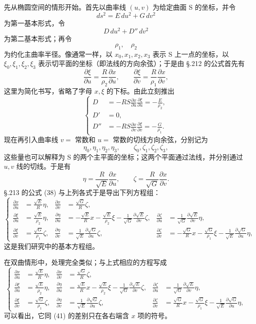 先从椭圆空间的情形开始。首先以曲率线 $(u,v)$ 为给定曲面 S 的坐标，并令
\[
ds^2=E\,du^2+G\,dv^2
\]
为第一基本形式，令
\[
D\,du^2+D''\,dv^2
\]
为第二基本形式；再令
\[
\rho_1,\quad \rho_2
\]
为约化主曲率半径。像通常一样，以 $x_0,x_1,x_2,x_3$ 表示 S 上一点的坐标，以 $\xi_0,\xi_1,\xi_2,\xi_3$ 表示切平面的坐标（即法线的方向余弦）；于是由 \S.212 的公式首先有
\[
\frac{\partial\xi}{\partial u}=\frac{R}{\rho_2}\frac{\partial x}{\partial u},\qquad
\frac{\partial\xi}{\partial v}=\frac{R}{\rho_1}\frac{\partial x}{\partial v},
\]
这里为简化书写，省略了字母 $x,\xi$ 的下标。由此立刻推出
\[
\left\{
\begin{aligned}
D&=-RS\frac{\partial x}{\partial u}\frac{\partial\xi}{\partial u}=-\frac{E}{\rho_2},\\
D'&=0,\\
D''&=-RS\frac{\partial x}{\partial v}\frac{\partial\xi}{\partial v}=-\frac{G}{\rho_1}.
\end{aligned}\right.
\]
现在再引入曲率线 $v=$ 常数和 $u=$ 常数的切线方向余弦，分别记为
\[
\eta_0,\eta_1,\eta_2,\eta_3,\qquad
\zeta_0,\zeta_1,\zeta_2,\zeta_3,
\]
这些量也可以解释为 S 的两个主平面的坐标；这两个平面通过法线，并分别通过 $u,v$ 线的切线。于是有
\[
\eta=\frac{R}{\sqrt E}\frac{\partial x}{\partial u},\qquad
\zeta=\frac{R}{\sqrt G}\frac{\partial x}{\partial v}.
\]
\S.213 的公式 (38) 与上列各式于是导出下列方程组：
\[
\tag{41}
\left\{
\begin{aligned}
\frac{\partial x}{\partial u}&=\frac{\sqrt E}{R}\eta,&
\frac{\partial x}{\partial v}&=\frac{\sqrt G}{R}\zeta,\\
\frac{\partial\xi}{\partial u}&=\frac{\sqrt E}{\rho_2}\eta,&
\frac{\partial\eta}{\partial u}&=-\frac{\sqrt E}{R}x-\frac{\sqrt E}{\rho_2}\xi-\frac1{\sqrt G}\frac{\partial\sqrt E}{\partial v}\zeta,&
\frac{\partial\zeta}{\partial u}&=\frac1{\sqrt G}\frac{\partial\sqrt E}{\partial v}\eta,\\
\frac{\partial\xi}{\partial v}&=\frac{\sqrt G}{\rho_1}\zeta,&
\frac{\partial\eta}{\partial v}&=\frac1{\sqrt E}\frac{\partial\sqrt G}{\partial u}\zeta,&
\frac{\partial\zeta}{\partial v}&=-\frac{\sqrt G}{R}x-\frac{\sqrt G}{\rho_1}\xi-\frac1{\sqrt E}\frac{\partial\sqrt G}{\partial u}\eta,
\end{aligned}\right.
\]
这是我们研究中的基本方程组。

在双曲情形中，处理完全类似；与上式相应的方程写成
\[
\tag{41*}
\left\{
\begin{aligned}
\frac{\partial x}{\partial u}&=\frac{\sqrt E}{R}\eta,&
\frac{\partial x}{\partial v}&=\frac{\sqrt G}{R}\zeta,\\
\frac{\partial\xi}{\partial u}&=\frac{\sqrt E}{\rho_2}\eta,&
\frac{\partial\eta}{\partial u}&=\frac{\sqrt E}{R}x-\frac{\sqrt E}{\rho_2}\xi-\frac1{\sqrt G}\frac{\partial\sqrt E}{\partial v}\zeta,&
\frac{\partial\zeta}{\partial u}&=\frac1{\sqrt G}\frac{\partial\sqrt E}{\partial v}\eta,\\
\frac{\partial\xi}{\partial v}&=\frac{\sqrt G}{\rho_1}\zeta,&
\frac{\partial\eta}{\partial v}&=\frac1{\sqrt E}\frac{\partial\sqrt G}{\partial u}\zeta,&
\frac{\partial\zeta}{\partial v}&=\frac{\sqrt G}{R}x-\frac{\sqrt G}{\rho_1}\xi-\frac1{\sqrt E}\frac{\partial\sqrt G}{\partial u}\eta,
\end{aligned}\right.
\]
可以看出，它同 (41) 的差别只在各右端含 $x$ 项的符号。

